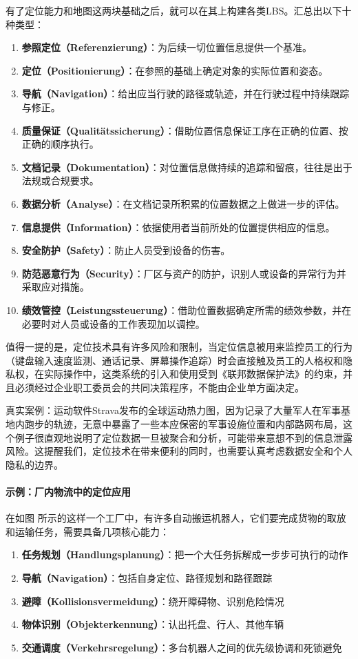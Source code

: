 有了定位能力和地图这两块基础之后，就可以在其上构建各类LBS。汇总出以下十种类型：
\begin{enumerate}
  \item \textbf{参照定位（Referenzierung）}：为后续一切位置信息提供一个基准。
  \item \textbf{定位（Positionierung）}：在参照的基础上确定对象的实际位置和姿态。
  \item \textbf{导航（Navigation）}：给出应当行驶的路径或轨迹，并在行驶过程中持续跟踪与修正。
  \item \textbf{质量保证（Qualitätssicherung）}：借助位置信息保证工序在正确的位置、按正确的顺序执行。
  \item \textbf{文档记录（Dokumentation）}：对位置信息做持续的追踪和留痕，往往是出于法规或合规要求。
  \item \textbf{数据分析（Analyse）}：在文档记录所积累的位置数据之上做进一步的评估。
  \item \textbf{信息提供（Information）}：依据使用者当前所处的位置提供相应的信息。
  \item \textbf{安全防护（Safety）}：防止人员受到设备的伤害。
  \item \textbf{防范恶意行为（Security）}：厂区与资产的防护，识别人或设备的异常行为并采取应对措施。
  \item \textbf{绩效管控（Leistungssteuerung）}：借助位置数据确定所需的绩效参数，并在必要时对人员或设备的工作表现加以调控。
\end{enumerate}

值得一提的是，定位技术具有许多风险和限制，当定位信息被用来监控员工的行为（键盘输入速度监测、通话记录、屏幕操作追踪）时会直接触及员工的人格权和隐私权，在实际操作中，这类系统的引入和使用受到《联邦数据保护法》的约束，并且必须经过企业职工委员会的共同决策程序，不能由企业单方面决定。

真实案例：运动软件Strava发布的全球运动热力图，因为记录了大量军人在军事基地内跑步的轨迹，无意中暴露了一些本应保密的军事设施位置和内部路网布局，这个例子很直观地说明了定位数据一旦被聚合和分析，可能带来意想不到的信息泄露风险。这提醒我们，定位技术在带来便利的同时，也需要认真考虑数据安全和个人隐私的边界。

\paragraph{示例：厂内物流中的定位应用}

在如图  所示的这样一个工厂中，有许多自动搬运机器人，它们要完成货物的取放和运输任务，需要具备几项核心能力：
\begin{enumerate}
  \item \textbf{任务规划（Handlungsplanung）}：把一个大任务拆解成一步步可执行的动作
  \item \textbf{导航（Navigation）}：包括自身定位、路径规划和路径跟踪
  \item \textbf{避障（Kollisionsvermeidung）}：绕开障碍物、识别危险情况
  \item \textbf{物体识别（Objekterkennung）}：认出托盘、行人、其他车辆
  \item \textbf{交通调度（Verkehrsregelung）}：多台机器人之间的优先级协调和死锁避免
\end{enumerate}

